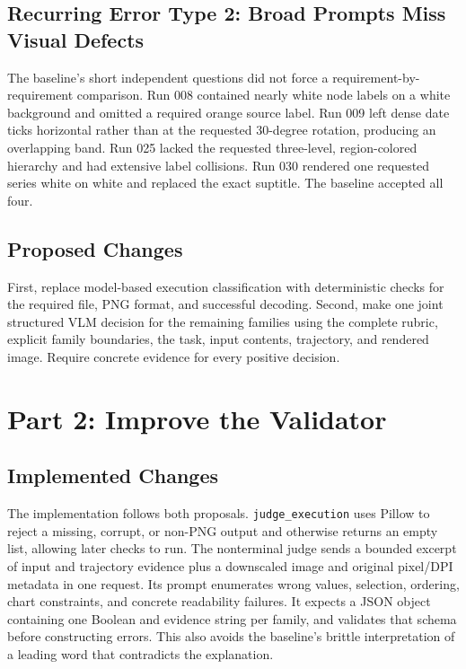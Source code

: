 \documentclass[11pt]{article}
\begin{document}
\subsection{Recurring Error Type 2: Broad Prompts Miss Visual Defects}
The baseline's short independent questions did not force a requirement-by-
requirement comparison. Run 008 contained nearly white node labels on a white
background and omitted a required orange source label. Run 009 left dense date
ticks horizontal rather than at the requested 30-degree rotation, producing an
overlapping band. Run 025 lacked the requested three-level, region-colored
hierarchy and had extensive label collisions. Run 030 rendered one requested
series white on white and replaced the exact suptitle. The baseline accepted
all four.

\subsection{Proposed Changes}
First, replace model-based execution classification with deterministic checks
for the required file, PNG format, and successful decoding. Second, make one
joint structured VLM decision for the remaining families using the complete
rubric, explicit family boundaries, the task, input contents, trajectory, and
rendered image. Require concrete evidence for every positive decision.

\section{Part 2: Improve the Validator}

\subsection{Implemented Changes}
The implementation follows both proposals. \texttt{judge\_execution} uses
Pillow to reject a missing, corrupt, or non-PNG output and otherwise returns an
empty list, allowing later checks to run. The nonterminal judge sends a bounded
excerpt of input and trajectory evidence plus a downscaled image and original
pixel/DPI metadata in one request. Its prompt enumerates wrong values,
selection, ordering, chart constraints, and concrete readability failures. It
expects a JSON object containing one Boolean and evidence string per family,
and validates that schema before constructing errors. This also avoids the
baseline's brittle interpretation of a leading word that contradicts the
explanation.
\end{document}
